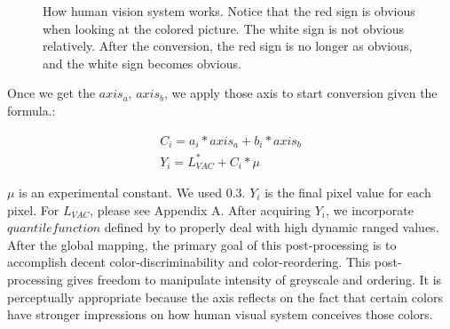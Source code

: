 \documentclass{article}
\begin{document}
\begin{figure}[t]
  \begin{center}
  \end{center}
  \caption{How human vision system works. Notice that the red sign is obvious when looking at the colored picture. The white sign is not obvious relatively. After the conversion, the red sign is no longer as obvious, and the white sign becomes obvious.}
  \label{fig:humanvisionsystem}
\end{figure}

 Once we get the $axis_a$, $axis_b$, we apply those axis to start conversion given the formula.:

\begin{eqnarray}
C_i = a_i * axis_a + b_i * axis_b \\
Y_i = L^*_{VAC} + C_i * \mu
\end{eqnarray}

$\mu$ is an experimental constant. We used 0.3. $Y_i$ is the final pixel value for each pixel. For $L_{VAC}$, please see Appendix A. 
After acquiring $Y_i$, we incorporate $quantile function$ defined by \cite{journals/pr/GrundlandD07} to properly deal with high dynamic ranged values. \\

 After the global mapping, the primary goal of this post-processing is to accomplish decent color-discriminability and color-reordering. This post-processing gives freedom to manipulate intensity of greyscale and ordering. It is perceptually appropriate because the axis reflects on the fact that certain colors have stronger impressions on how human visual system conceives those colors.
\end{document}
